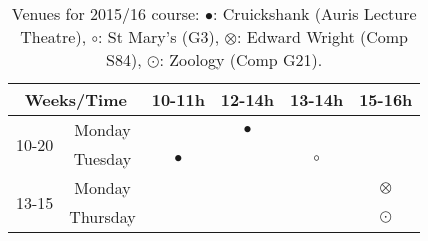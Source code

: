 \documentclass[12pts,a4paper,amsmath,amssymb,floatfix]{article}%
\begin{document}
\begin{table}[h]
\begin{center}
\begin{tabular}{ c || c | c c c | c }
\hline\hline
\multicolumn{2}{c}{\bf Weeks/Time} & {\bf 10-11h} & {\bf 12-14h} & {\bf 13-14h} & {\bf 15-16h} \\
\hline\hline
\multirow{2}{*}{10-20} & Monday    &             &  $\bullet$   &            &             \\
                       & Tuesday   & $\bullet$   &              &   $\circ$  &             \\
\hline 
\multirow{2}{*}{13-15} & Monday    &             &              &            &   $\otimes$ \\
                       & Thursday  &             &              &            &   $\odot$    \\
\hline
\end{tabular}
\end{center}
\caption{Venues for 2015/16 course: $\bullet$: Cruickshank (Auris Lecture Theatre), $\circ$: St Mary's (G3), $\otimes$: Edward Wright (Comp S84), $\odot$: Zoology (Comp G21).}
\label{table:timetable}
\end{table}
\end{document}
